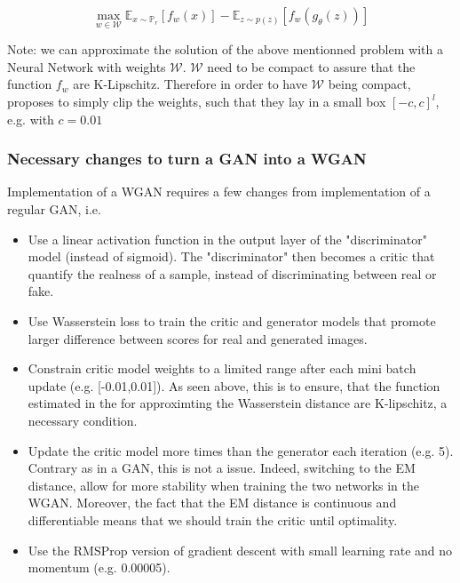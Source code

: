 \documentclass{article}
\begin{document}
\begin{equation}
    \max_{w \in \mathcal{W}}  \mathbb{E}_{x \sim \mathbb{P}_r}[f_w(x)] - \mathbb{E}_{z \sim p(z)}[f_w(g_{\theta}(z))]
\end{equation}

Note: we can approximate the solution of the above mentionned problem with a Neural Network with weights $\mathcal{W}$. $\mathcal{W}$ need to be compact to assure that the function $f_w$ are K-Lipschitz. Therefore in order to have $\mathcal{W}$ being compact, \cite{arjovsky2017wasserstein} proposes to simply clip the weights, such that they lay in a small box $[-c, c]^l$, e.g. with $c = 0.01$

\subsubsection{Necessary changes to turn a GAN into a WGAN}

Implementation of a WGAN requires a few changes from implementation of a regular GAN, i.e. 

\begin{itemize}
    \item Use a linear activation function in the output layer of the "discriminator" model (instead of sigmoid). The "discriminator" then becomes a critic that quantify the realness of a sample, instead of discriminating between real or fake.
    \item Use Wasserstein loss to train the critic and generator models that promote larger difference between scores for real and generated images. 
    \item Constrain critic model weights to a limited range after each mini batch update (e.g. [-0.01,0.01]). As seen above, this is to ensure, that the function estimated in the for approximting the Wasserstein distance are K-lipschitz, a necessary condition.
    \item Update the critic model more times than the generator each iteration (e.g. 5). Contrary as in a GAN, this is not a issue. Indeed, switching to the EM distance, allow for more stability when training the two networks in the WGAN. Moreover, the fact that the EM distance is continuous and differentiable means that we should train the critic until optimality.
    \item Use the RMSProp version of gradient descent with small learning rate and no momentum (e.g. 0.00005).
    
\end{itemize}
\end{document}
